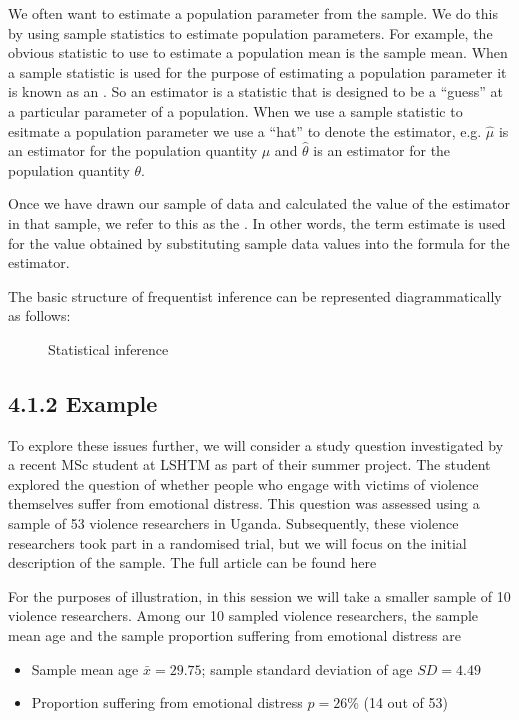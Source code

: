 \documentclass[letterpaper,10pt,english]{jupyterBook}
\let\sphinxpxdimen\pdfpxdimen\else\newdimen\sphinxpxdimen
\begin{document}
\sphinxAtStartPar
We often want to estimate a population parameter from the sample. We do this by using sample statistics to estimate population parameters. For example, the obvious statistic to use to estimate a population mean is the sample mean.  When a sample statistic is used for the purpose of estimating a population parameter it is known as an .  So an estimator is a statistic that is  designed to be a “guess” at a particular parameter of a population.  When we use a sample statistic to esitmate a population parameter we use a “hat” to denote the estimator, e.g. \(\hat{\mu}\) is an estimator for the population quantity \(\mu\) and \(\hat{\theta}\) is an estimator for the population quantity \(\theta\).

\sphinxAtStartPar
Once we have drawn our sample of data and calculated the value of the estimator in that sample, we refer to this as the . In other words, the term estimate is used for the value obtained by substituting sample data values into the formula for the estimator.

\sphinxAtStartPar
The basic structure of frequentist inference can be represented diagrammatically as follows:

\begin{figure}[htbp]
\centering
\capstart

\noindent\sphinxincludegraphics[height=400\sphinxpxdimen]{{Inference}.png}
\caption{Statistical inference}\label{\detokenize{04.b. Population.and.samples:freq-inference}}\end{figure}


\subsection{4.1.2 Example}
\label{\detokenize{04.b. Population.and.samples:example}}
\sphinxAtStartPar
To explore these issues further, we will consider a study question investigated by a recent MSc student at LSHTM as part of their summer project. The student explored the question of whether people who engage with victims of violence themselves suffer from emotional distress. This question was assessed using a sample of 53 violence researchers in Uganda. Subsequently, these violence researchers took part in a randomised trial, but we will focus on the initial description of the sample. The full article can be found here 

\sphinxAtStartPar
For the purposes of illustration, in this session we will take a smaller sample of 10 violence researchers. Among our 10 sampled violence researchers, the sample mean age and the sample proportion suffering from emotional distress are
\begin{itemize}
\item {} 
\sphinxAtStartPar
Sample mean age \(\bar{x}= 29.75\); sample standard deviation of age \(SD = 4.49\)

\item {} 
\sphinxAtStartPar
Proportion suffering from emotional distress \(p = 26\%\) (14 out of 53)

\end{itemize}
\end{document}
